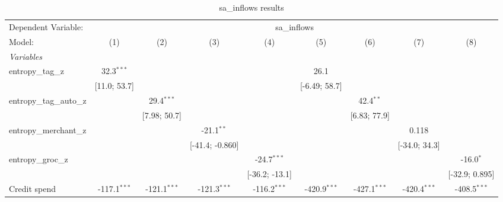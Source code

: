 
\begin{table}[htbp]
   \centering
   \tiny
   \begin{threeparttable}[b]
      \caption{\label{tab:reg_sa_inflows_full} sa\_inflows results}
      \begin{tabular}{lcccccccc}
         \tabularnewline \midrule \midrule
         Dependent Variable: & \multicolumn{8}{c}{sa\_inflows}\\
         Model:                   & (1)              & (2)              & (3)              & (4)              & (5)              & (6)              & (7)              & (8)\\  
         \midrule
         \emph{Variables}\\
         entropy\_tag\_z          & 32.3$^{***}$     &                  &                  &                  & 26.1             &                  &                  &   \\   
                                  & [11.0; 53.7]     &                  &                  &                  & [-6.49; 58.7]    &                  &                  &   \\   
         entropy\_tag\_auto\_z    &                  & 29.4$^{***}$     &                  &                  &                  & 42.4$^{**}$      &                  &   \\   
                                  &                  & [7.98; 50.7]     &                  &                  &                  & [6.83; 77.9]     &                  &   \\   
         entropy\_merchant\_z     &                  &                  & -21.1$^{**}$     &                  &                  &                  & 0.118            &   \\   
                                  &                  &                  & [-41.4; -0.860]  &                  &                  &                  & [-34.0; 34.3]    &   \\   
         entropy\_groc\_z         &                  &                  &                  & -24.7$^{***}$    &                  &                  &                  & -16.0$^{*}$\\   
                                  &                  &                  &                  & [-36.2; -13.1]   &                  &                  &                  & [-32.9; 0.895]\\   
         Credit spend             & -117.1$^{***}$   & -121.1$^{***}$   & -121.3$^{***}$   & -116.2$^{***}$   & -420.9$^{***}$   & -427.1$^{***}$   & -420.4$^{***}$   & -408.5$^{***}$\\   

\end{tabular}
\end{threeparttable}
\end{table}
